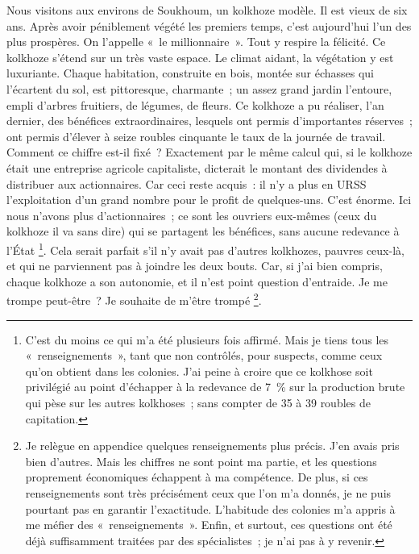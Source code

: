 \documentclass[french,twoside]{book} %
\begin{document}
Nous visitons aux environs de Soukhoum, un kolkhoze modèle. Il est vieux de six ans. Après avoir péniblement végété les premiers temps, c’est aujourd’hui l’un des plus prospères. On l’appelle « le millionnaire ». Tout y respire la félicité. Ce kolkhoze s’étend sur un très vaste espace. Le climat aidant, la végétation y est luxuriante. Chaque habitation, construite en bois, montée sur échasses qui l’écartent du sol, est pittoresque, charmante ; un assez grand jardin l’entoure, empli d’arbres fruitiers, de légumes, de fleurs. Ce kolkhoze a pu réaliser, l’an dernier, des bénéfices extraordinaires, lesquels ont permis d’importantes réserves ; ont permis d’élever à seize roubles cinquante le taux de la journée de travail. Comment ce chiffre est-il fixé ? Exactement par le même calcul qui, si le kolkhoze était une entreprise agricole capitaliste, dicterait le montant des dividendes à distribuer aux actionnaires. Car ceci reste acquis : il n’y a plus en URSS l’exploitation d’un grand nombre pour le profit de quelques-uns. C’est énorme. Ici nous n’avons plus d’actionnaires ; ce sont les ouvriers eux-mêmes (ceux du kolkhoze il va sans dire) qui se partagent les bénéfices, sans aucune redevance à l’État \footnote{C’est du moins ce qui m’a été plusieurs fois affirmé. Mais je tiens tous les « renseignements », tant que non contrôlés, pour suspects, comme ceux qu’on obtient dans les colonies. J’ai peine à croire que ce kolkhose soit privilégié au point d’échapper à la redevance de 7 \% sur la production brute qui pèse sur les autres kolkhoses ; sans compter de 35 à 39 roubles de capitation.}. Cela serait parfait s’il n’y avait pas d’autres kolkhozes, pauvres ceux-là, et qui ne parviennent pas à joindre les deux bouts. Car, si j’ai bien compris, chaque kolkhoze a son autonomie, et il n’est point question d’entraide. Je me trompe peut-être ? Je souhaite de m’être trompé \footnote{Je relègue en appendice quelques renseignements plus précis. J’en avais pris bien d’autres. Mais les chiffres ne sont point ma partie, et les questions proprement économiques échappent à ma compétence. De plus, si ces renseignements sont très précisément ceux que l’on m’a donnés, je ne puis pourtant pas en garantir l’exactitude. L’habitude des colonies m’a appris à me méfier des « renseignements ». Enfin, et surtout, ces questions ont été déjà suffisamment traitées par des spécialistes ; je n’ai pas à y revenir.}.\par
\end{document}
